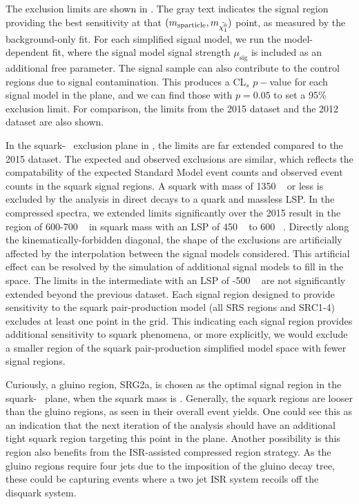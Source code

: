 The exclusion limits are shown in .
The gray text indicates the signal region providing the best sensitivity at that $(m_{\mathrm{sparticle}}, m_{\tilde{\chi^0_1}})$ point, as measured by the background-only fit.
For each simplified signal model, we run the model-dependent fit, where the signal model signal strength $\mu_{\mathrm{sig}}$ is included as an additional free parameter.
The signal sample can also contribute to the control regions due to signal contamination.
This produces a CL$_s$ $p-$value for each signal model in the plane, and we can find those with $p = 0.05$ to set a 95\% exclusion limit.
For comparison, the limits from the 2015 dataset and the 2012 dataset are also shown.

In the squark-\lsp~ exclusion plane in , the limits are far extended compared to the 2015 dataset.
The expected and observed exclusions are similar, which reflects the compatability of the expected Standard Model event counts and observed event counts in the squark signal regions.
A squark with mass of 1350 \GeV~ or less is excluded by the analysis in direct decays to a quark and massless LSP.
In the compressed spectra, we extended limits significantly over the 2015 result in the region of 600-700 \GeV~ in squark mass with an LSP of 450 \GeV~ to 600 \GeV~.
Directly along the kinematically-forbidden diagonal, the shape of the exclusions are artificially affected by the interpolation between the signal models considered.
This artificial effect can be resolved by the simulation of additional signal models to fill in the space.
The limits in the intermediate with an LSP of -500 \GeV~ are not significantly extended beyond the previous dataset.
Each signal region designed to provide sensitivity to the squark pair-production model (all SRS regions and SRC1-4) excludes at least one point in the grid.
This indicating each signal region provides additional sensitivity to squark phenomena, or more explicitly, we would exclude a smaller region of the squark pair-production simplified model space with fewer signal regions.

Curiously, a gluino region, SRG2a, is chosen as the optimal signal region in the squark-\lsp~ plane, when the squark mass is  \GeV.
Generally, the squark regions are looser than the gluino regions, as seen in their overall event yields.
One could see this as an indication that the next iteration of the analysis should have an additional tight squark region targeting this point in the plane.
Another possibility is this region also benefits from the ISR-assisted compressed region strategy.
As the gluino regions require four jets due to the imposition of the gluino decay tree, these could be capturing events where a two jet ISR system recoils off the disquark system.


